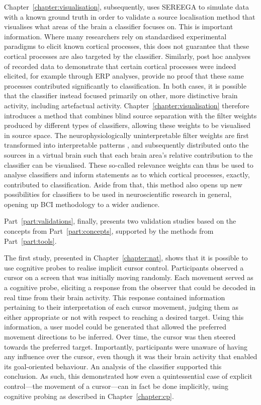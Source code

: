 Chapter~\ref{chapter:visualisation}, subsequently, uses SEREEGA to simulate data with a known ground truth in order to validate a source localisation method that visualises what areas of the brain a classifier focuses on. This is important information. Where many researchers rely on standardised experimental paradigms to elicit known cortical processes, this does not guarantee that these cortical processes are also targeted by the classifier. Similarly, post hoc analyses of recorded data to demonstrate that certain cortical processes were indeed elicited, for example through ERP analyses, provide no proof that these same processes contributed significantly to classification. In both cases, it is possible that the classifier instead focused primarily on other, more distinctive brain activity, including artefactual activity. Chapter~\ref{chapter:visualisation} therefore introduces a method that combines blind source separation with the filter weights produced by different types of classifiers, allowing these weights to be visualised in source space. The neurophysiologically uninterpretable filter weights are first transformed into interpretable patterns \cite{haufe2014}, and subsequently distributed onto the sources in a virtual brain such that each brain area's relative contribution to the classifier can be visualised. These so-called relevance weights can thus be used to analyse classifiers and inform statements as to which cortical processes, exactly, contributed to classification. Aside from that, this method also opens up new possibilities for classifiers to be used in neuroscientific research in general, opening up BCI methodology to a wider audience.
 
Part~\ref{part:validations}, finally, presents two validation studies based on the concepts from Part~\ref{part:concepts}, supported by the methods from Part~\ref{part:tools}. 

The first study, presented in Chapter~\ref{chapter:nat}, shows that it is possible to use cognitive probes to realise implicit cursor control. Participants observed a cursor on a screen that was initially moving randomly. Each movement served as a cognitive probe, eliciting a response from the observer that could be decoded in real time from their brain activity. This response contained information pertaining to their interpretation of each cursor movement, judging them as either appropriate or not with respect to reaching a desired target. Using this information, a user model could be generated that allowed the preferred movement directions to be inferred. Over time, the cursor was then steered towards the preferred target. Importantly, participants were unaware of having any influence over the cursor, even though it was their brain activity that enabled its goal-oriented behaviour. An analysis of the classifier supported this conclusion. As such, this demonstrated how even a quintessential case of explicit control---the movement of a cursor---can in fact be done implicitly, using cognitive probing as described in Chapter~\ref{chapter:cp}.

